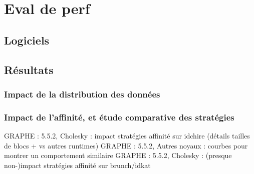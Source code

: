 \section{Eval de perf}
\subsection{Logiciels}
\subsection{Résultats}

\subsubsection{Impact de la distribution des données}

\subsubsection{Impact de l'affinité, et étude comparative des stratégies}

GRAPHE : 5.5.2, Cholesky : impact stratégies affinité sur idchire (détails tailles de blocs + vs autres runtimes)
GRAPHE : 5.5.2, Autres noyaux : courbes pour montrer un comportement similaire
GRAPHE : 5.5.2, Cholesky : (presque non-)impact stratégies affinité sur brunch/idkat

